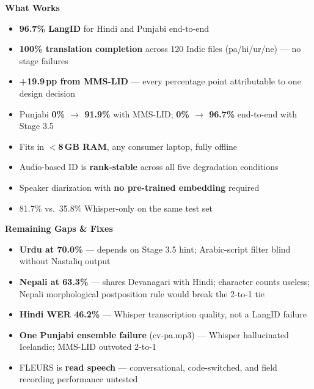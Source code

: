 \documentclass[11pt,a4paper]{article}
\begin{document}
\noindent
\begin{minipage}[t]{0.48\textwidth}
\begin{tcolorbox}[enhanced,colback=LGreen,colframe=DGreen,arc=6pt,boxrule=2pt,
  left=8pt,right=8pt,top=7pt,bottom=7pt,shadow={2pt}{-2pt}{0pt}{black!12}]
\textbf{\color{DGreen}\large What Works}\\[4pt]
\begin{itemize}[leftmargin=*,itemsep=2pt,topsep=0pt]
  \item \textbf{96.7\% LangID} for Hindi and Punjabi end-to-end
  \item \textbf{100\% translation completion} across 120 Indic files (pa/hi/ur/ne) --- no stage failures
  \item \textbf{+19.9\,pp from MMS-LID} --- every percentage point attributable to one design decision
  \item Punjabi \textbf{0\% $\to$ 91.9\%} with MMS-LID; \textbf{0\% $\to$ 96.7\%} end-to-end with Stage 3.5
  \item Fits in \textbf{$<$8\,GB RAM}, any consumer laptop, fully offline
  \item Audio-based ID is \textbf{rank-stable} across all five degradation conditions
  \item Speaker diarization with \textbf{no pre-trained embedding} required
  \item 81.7\% vs.\ 35.8\% Whisper-only on the same test set
\end{itemize}
\end{tcolorbox}
\end{minipage}\hfill
\begin{minipage}[t]{0.48\textwidth}
\begin{tcolorbox}[enhanced,colback=LRed,colframe=DRed,arc=6pt,boxrule=2pt,
  left=8pt,right=8pt,top=7pt,bottom=7pt,shadow={2pt}{-2pt}{0pt}{black!12}]
\textbf{\color{DRed}\large Remaining Gaps \& Fixes}\\[4pt]
\begin{itemize}[leftmargin=*,itemsep=2pt,topsep=0pt]
  \item \textbf{Urdu at 70.0\%} --- depends on Stage 3.5 hint; Arabic-script filter blind without Nastaliq output
  \item \textbf{Nepali at 63.3\%} --- shares Devanagari with Hindi; character counts useless; Nepali morphological postposition rule would break the 2-to-1 tie
  \item \textbf{Hindi WER 46.2\%} --- Whisper transcription quality, not a LangID failure
  \item \textbf{One Punjabi ensemble failure} (cv-pa.mp3) --- Whisper hallucinated Icelandic; MMS-LID outvoted 2-to-1
  \item FLEURS is \textbf{read speech} --- conversational, code-switched, and field recording performance untested
\end{itemize}
\end{tcolorbox}
\end{minipage}
\end{document}
